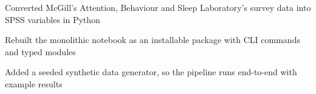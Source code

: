 \vspace{\betweenentry}
\begin{points}
  \item Converted McGill's Attention, Behaviour and Sleep Laboratory's survey data into SPSS variables in Python
  \item Rebuilt the monolithic notebook as an installable package with CLI commands and typed modules
  \item Added a seeded synthetic data generator, so the pipeline runs end-to-end with example results
\end{points}





